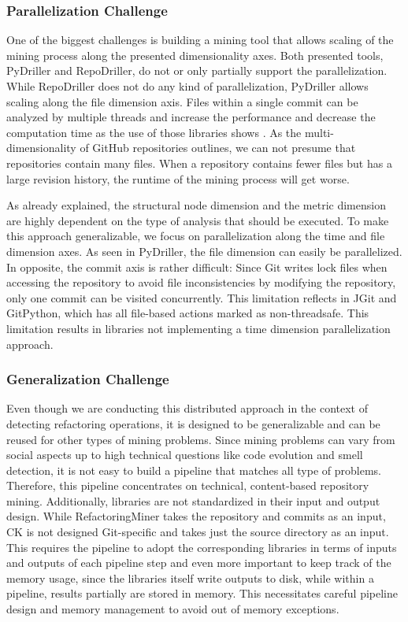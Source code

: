 \subsubsection{Parallelization Challenge}
One of the biggest challenges is building a mining tool that allows scaling of the mining process along the presented dimensionality axes. Both presented tools, PyDriller and RepoDriller, do not or only partially support the parallelization. While RepoDriller does not do any kind of parallelization, PyDriller allows scaling along the file dimension axis. Files within a single commit can be analyzed by multiple threads and increase the performance and decrease the computation time as the use of those libraries shows \cite{Gote2019}. As the multi-dimensionality of GitHub repositories outlines, we can not presume that repositories contain many files. When a repository contains fewer files but has a large revision history, the runtime of the mining process will get worse.

As already explained, the structural node dimension and the metric dimension are highly dependent on the type of analysis that should be executed. To make this approach generalizable, we focus on parallelization along the time and file dimension axes. As seen in PyDriller, the file dimension can easily be parallelized. In opposite, the commit axis is rather difficult: Since Git writes lock files when accessing the repository to avoid file inconsistencies by modifying the repository, only one commit can be visited concurrently. This limitation reflects in JGit and GitPython, which has all file-based actions marked as non-threadsafe. This limitation results in libraries not implementing a time dimension parallelization approach.

\subsubsection{Generalization Challenge}
Even though we are conducting this distributed approach in the context of detecting refactoring operations, it is designed to be generalizable and can be reused for other types of mining problems. Since mining problems can vary from social aspects up to high technical questions like code evolution and smell detection, it is not easy to build a pipeline that matches all type of problems. Therefore, this pipeline concentrates on technical, content-based repository mining. Additionally, libraries are not standardized in their input and output design. While RefactoringMiner takes the repository and commits as an input, CK is not designed Git-specific and takes just the source directory as an input. This requires the pipeline to adopt the corresponding libraries in terms of inputs and outputs of each pipeline step and even more important to keep track of the memory usage, since the libraries itself write outputs to disk, while within a pipeline, results partially are stored in memory. This necessitates careful pipeline design and memory management to avoid out of memory exceptions.